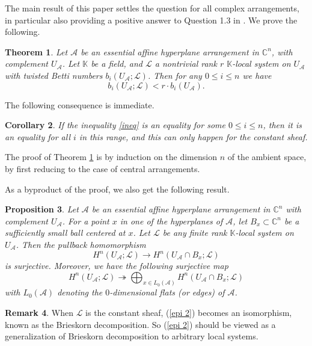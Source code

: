 \documentclass[12pt,leqno,twoside]{amsart}
\theoremstyle{plain}
\newtheorem{theorem}{Theorem}[section]
\newtheorem{prop}[theorem]{Proposition}
\newtheorem{cor}[theorem]{Corollary}
\theoremstyle{definition}
\newtheorem{rmk}[theorem]{Remark}
\newcommand{\C}{\mathbb{C}}
\newcommand{\K}{\mathbb{K}}
\newcommand{\sA}{\mathcal{A}}
\newcommand{\sL}{\mathcal{L}}
\begin{document}
The main result of this paper settles the question for all complex arrangements, in particular also providing a positive answer to Question 1.3 in \cite{LY}. We prove the following.
\begin{theorem}\label{thmain}
Let $\sA$ be an essential affine hyperplane arrangement in $\C^n$, with complement $U_\sA$. Let $\K$ be a field, and $\sL$ a nontrivial rank $r$ $\K$-local system on $U_\sA$ with twisted Betti numbers $b_i(U_\sA;\sL)$.  Then for any $0\leq i \leq n$ we have
\[
b_i(U_\sA;\sL)<r\cdot b_i(U_\sA).
\]
\end{theorem}

The following consequence is immediate.
\begin{cor}
If the inequality \eqref{ineq}  is an equality for some $0 \leq i \leq n$, then it is an equality for all $i$ in this range, and this can only happen for the constant sheaf.
\end{cor}

The proof of Theorem \ref{thmain} is by induction on the dimension $n$ of the ambient space, by first reducing to the case of central arrangements.

As a byproduct of the proof, we also get the following result.
\begin{prop} \label{prop surj} Let $\sA$ be an essential affine hyperplane arrangement in $\C^n$ with complement $U_\sA$. For a point $x$ in one of the hyperplanes of $\sA$, let $B_x\subset \C^n$ be a sufficiently small ball centered at $x$. Let $\sL$ be any finite rank $\K$-local system on $U_{\sA}$. 
Then the pullback homomorphism
\[
H^{n}(U_\sA; \sL)\to H^{n}(U_\sA\cap B_x ; \sL)
\]
is surjective. Moreover, we have the following surjective map 
\begin{equation} \label{epi 2}
  H^{n}(U_\sA; \sL)\twoheadrightarrow \bigoplus_{x\in L_0(\sA)} H^{n}(U_\sA\cap B_x ; \sL)  
\end{equation}
with $L_0(\sA)$ denoting the $0$-dimensional flats (or edges) of $\sA$.
\end{prop}
\begin{rmk}
    When $\sL$ is the constant sheaf, (\ref{epi 2}) becomes an isomorphism, known as the Brieskorn decomposition. So (\ref{epi 2}) should be viewed as a generalization of Brieskorn decomposition to arbitrary local systems. 
\end{rmk}


\medskip
\end{document}
